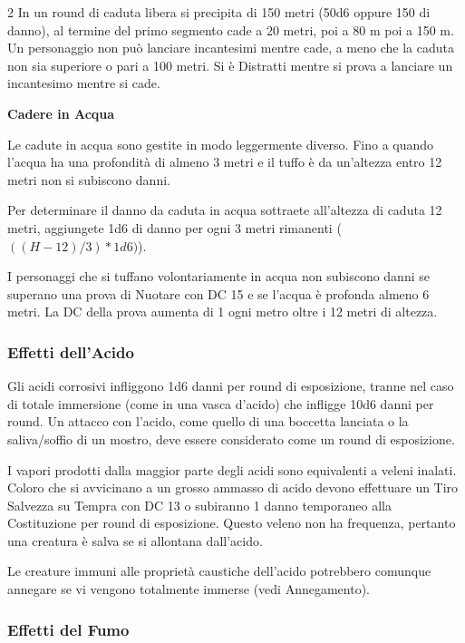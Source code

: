 \begin{multicols}{2}
In un round di caduta libera si precipita di 150 metri (50d6 oppure 150 di danno), al termine del primo segmento cade a 20 metri, poi a 80 m poi a 150 m. Un personaggio non può lanciare incantesimi mentre cade, a meno che la caduta non sia superiore o pari a 100 metri. Si è Distratti mentre si prova a lanciare un incantesimo mentre si cade.

\medskip

\noindent \textbf{Cadere in Acqua}

Le cadute in acqua sono gestite in modo leggermente diverso. Fino a quando l'acqua ha una profondità di almeno 3 metri e il tuffo è da un'altezza entro 12 metri non si subiscono danni.

Per determinare il danno da caduta in acqua sottraete all'altezza di caduta 12 metri, aggiungete 1d6 di danno per ogni 3 metri rimanenti ($((H-12)/3)*1d6)$).

I personaggi che si tuffano volontariamente in acqua non subiscono danni se superano una prova di Nuotare con DC 15 e se l'acqua è profonda almeno 6 metri. La DC della prova aumenta di 1 ogni metro oltre i 12 metri di altezza.

\subsubsection{Effetti dell'Acido}

\label{effetti-dellacido}

Gli acidi corrosivi infliggono 1d6 danni per round di esposizione, tranne nel caso di totale immersione (come in una vasca d'acido) che infligge 10d6 danni per round. Un attacco con l'acido, come quello di una boccetta lanciata o la saliva/soffio di un mostro, deve essere considerato come un round di esposizione.

I vapori prodotti dalla maggior parte degli acidi sono equivalenti a veleni inalati. Coloro che si avvicinano a un grosso ammasso di acido devono effettuare un Tiro Salvezza su Tempra con DC 13 o subiranno 1 danno temporaneo alla Costituzione per round di esposizione. Questo veleno non ha frequenza, pertanto una creatura è salva se si allontana dall'acido.

Le creature immuni alle proprietà caustiche dell'acido potrebbero comunque annegare se vi vengono totalmente immerse (vedi Annegamento).

\subsubsection{Effetti del Fumo}


\end{multicols}
